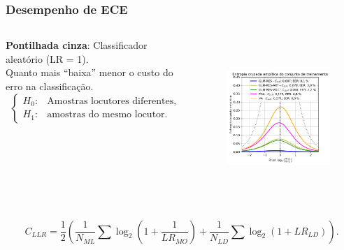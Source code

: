 \documentclass[121pt, aspectratio=169, t]{beamer}
\begin{document}
\begin{frame}[fragile=singleslide]
	\frametitle{Desempenho de ECE}
	\begin{columns}
		\begin{column}{0.45\textwidth}
			\textbf{Pontilhada cinza}: Classificador aleatório (LR = 1).\\
			\vspace{0.5cm}
			Quanto mais ``baixa'' menor o custo do erro na classificação.
			\begin{equation} \label{Hip_Hipotese_Anuncio}
				\begin{cases}
					H_0: & \text{Amostras locutores diferentes,}\\ \nonumber
					H_1: & \text{amostras do mesmo locutor.} 
				\end{cases}
			\end{equation}
		\end{column}
		\begin{column}{0.55\textwidth}  %
			\vspace{-1.0cm}
			\begin{figure}
				\centering
				\includegraphics[height=6cm]{ECE_01.jpg}
			\end{figure}
		\end{column}
	\end{columns}
	\vfill
	\[ 
	C_{LLR} = \frac{1}{2} \left( \frac{1}{N_{ML}} \sum \log_{2} \left(1+ \frac{1}{LR_{MO}} \right) + \frac{1}{N_{LD}} \sum \log_{2} \left(1 + LR_{LD} \right) \right).
	\]
\end{frame}
\end{document}
